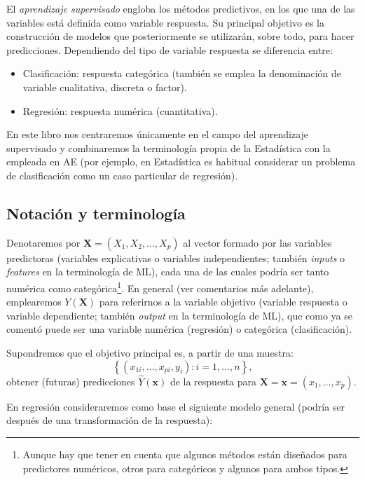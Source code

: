 \documentclass[]{book}
\theoremstyle{break}
\theoremstyle{definition}
\theoremstyle{definition}
\theoremstyle{definition}
\theoremstyle{remark}
\begin{document}
El \emph{aprendizaje supervisado} engloba los métodos predictivos, en
los que una de las variables está definida como variable respuesta. Su
principal objetivo es la construcción de modelos que posteriormente se
utilizarán, sobre todo, para hacer predicciones. Dependiendo del tipo de
variable respuesta se diferencia entre:

\begin{itemize}
\item
  Clasificación: respuesta categórica (también se emplea la denominación
  de variable cualitativa, discreta o factor).
\item
  Regresión: respuesta numérica (cuantitativa).
\end{itemize}

En este libro nos centraremos únicamente en el campo del aprendizaje
supervisado y combinaremos la terminología propia de la Estadística con
la empleada en AE (por ejemplo, en Estadística es habitual considerar un
problema de clasificación como un caso particular de regresión).

\subsection{Notación y
terminología}\label{notaciuxf3n-y-terminologuxeda}

Denotaremos por \(\mathbf{X}=(X_1, X_2, \ldots, X_p)\) al vector formado
por las variables predictoras (variables explicativas o variables
independientes; también \emph{inputs} o \emph{features} en la
terminología de ML), cada una de las cuales podría ser tanto numérica
como categórica\footnote{Aunque hay que tener en cuenta que algunos
  métodos están diseñados para predictores numéricos, otros para
  categóricos y algunos para ambos tipos.}. En general (ver comentarios
más adelante), emplearemos \(Y\left(\mathbf{X} \right)\) para referirnos
a la variable objetivo (variable respuesta o variable dependiente;
también \emph{output} en la terminología de ML), que como ya se comentó
puede ser una variable numérica (regresión) o categórica
(clasificación).

Supondremos que el objetivo principal es, a partir de una muestra:
\[\left\{ \left( x_{1i}, \ldots, x_{pi}, y_{i} \right)  : i = 1, \ldots, n \right\},\]
obtener (futuras) predicciones \(\hat Y\left(\mathbf{x} \right)\) de la
respuesta para
\(\mathbf{X}=\mathbf{x}=\left(x_{1}, \ldots, x_{p}\right)\).

En regresión consideraremos como base el siguiente modelo general
(podría ser después de una transformación de la respuesta):
\end{document}
